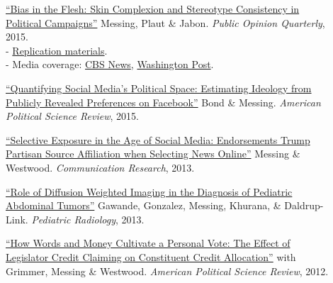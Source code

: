 \documentclass[letterpaper,11pt]{article}
\begin{document}
\begin{description}
\item[] \href{https://www.dropbox.com/s/et4rnj2duzsuhiq/HSVmetricsCampaignsDarknessPOQFINAL.pdf?raw=true}{``Bias in the Flesh: Skin Complexion and Stereotype Consistency in Political Campaigns''} Messing, Plaut \& Jabon.
 \emph{Public Opinion Quarterly}, 2015. \\
- \href{https://dataverse.harvard.edu/dataset.xhtml?persistentId=doi:10.7910/DVN/F0NDJP}{Replication materials}. \\
- Media coverage: \href{http://www.cbsnews.com/news/study-2008-mccain-attack-ads-darkened-obama-skin-tone/}{CBS News}, \href{https://www.washingtonpost.com/news/wonk/wp/2015/12/29/obamas-skin-looks-a-little-different-in-these-gop-campaign-ads/}{Washington Post}. 

\item[] \href{https://dl.dropboxusercontent.com/u/25710348/EstimatingIdeologyFromFacebookPageLikes.pdf}{``Quantifying Social Media's Political Space: Estimating Ideology from Publicly Revealed Preferences on Facebook''} Bond \& Messing. 
\emph{American Political Science Review}, 2015.


\item[] \href{https://www.dropbox.com/s/sl847m7z7uzonro/CH3.pdf}{``Selective Exposure in the Age of Social Media: Endorsements Trump Partisan Source Affiliation when Selecting News Online''} Messing \& Westwood. 
\emph{Communication Research}, 2013.

\item[] \href{https://www.ncbi.nlm.nih.gov/pubmed/23666206}{``Role of Diffusion Weighted Imaging in the Diagnosis of Pediatric Abdominal Tumors''} Gawande, Gonzalez, Messing, Khurana, \& Daldrup-Link. 
\emph{Pediatric Radiology}, 2013.

\item[] \href{http://stanford.edu/~jgrimmer/cc.pdf}{``How Words and Money Cultivate a Personal Vote: The Effect of Legislator Credit Claiming on Constituent Credit Allocation''} with Grimmer, Messing \& Westwood.
\emph{American Political Science Review}, 2012.


\end{description}
\end{document}
